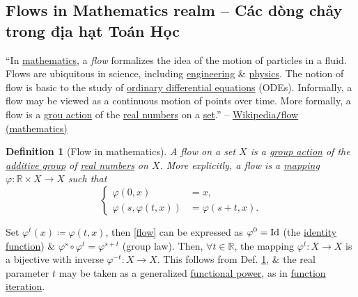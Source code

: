 \documentclass[12pt,oneside]{book}
\newtheorem{definition}{Definition}[section]
\begin{document}
\subsection{Flows in Mathematics realm -- Các dòng chảy trong địa hạt Toán Học}
``In \href{https://en.wikipedia.org/wiki/Mathematics}{mathematics},  a {\it flow} formalizes the idea of the motion of particles in a fluid. Flows are ubiquitous in science, including \href{https://en.wikipedia.org/wiki/Engineering}{engineering} \& \href{https://en.wikipedia.org/wiki/Physics}{physics}. The notion of flow is basic to the study of \href{https://en.wikipedia.org/wiki/Ordinary_differential_equation}{ordinary differential equations} (ODEs). Informally, a flow may be viewed as a continuous motion of points over time. More formally, a flow is a \href{https://en.wikipedia.org/wiki/Group_action_(mathematics)}{grou action} of the \href{https://en.wikipedia.org/wiki/Real_number}{real numbers} on a \href{https://en.wikipedia.org/wiki/Set_(mathematics)}{set}.'' -- \href{https://en.wikipedia.org/wiki/Flow_(mathematics)}{Wikipedia{\tt/}flow (mathematics)}

\begin{definition}[Flow in mathematics]
	\label{def: flow}
	A \emph{flow} on a set $X$ is a \href{https://en.wikipedia.org/wiki/Group_action_(mathematics)}{group action} of the \href{https://en.wikipedia.org/wiki/Additive_group}{additive group} of \href{https://en.wikipedia.org/wiki/Real_number}{real numbers} on $X$. More explicitly, a flow is a \href{https://en.wikipedia.org/wiki/Function_(mathematics)}{mapping} $\varphi:\mathbb{R}\times X\to X$ such that
	\begin{equation}
		\label{flow}
		\tag{fl}
		\left\{\begin{split}
			\varphi(0,x) &= x,\\
			\varphi(s,\varphi(t,x)) &= \varphi(s + t,x).
		\end{split}\right.
	\end{equation}
\end{definition}
Set $\varphi^t(x)\coloneqq\varphi(t,x)$, then \eqref{flow} can be expressed as $\varphi^0 = {\rm Id}$ (the \href{https://en.wikipedia.org/wiki/Identity_function}{identity function}) \& $\varphi^s\circ\varphi^t = \varphi^{s + t}$ (group law). Then, $\forall t\in\mathbb{R}$, the mapping $\varphi^t:X\to X$ is a bijective with inverse $\varphi^{-t}:X\to X$. This follows from Def. \ref{def: flow}, \& the real parameter $t$ may be taken as a generalized \href{https://en.wikipedia.org/wiki/Functional_power}{functional power}, as in \href{https://en.wikipedia.org/wiki/Function_iteration}{function iteration}.
\end{document}
